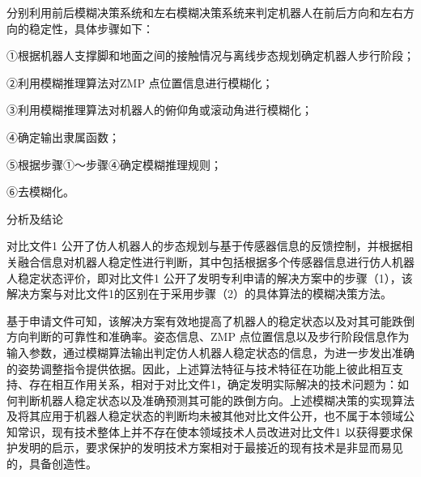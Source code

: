 {\setlength{\parindent}{15.3bp}分别利用前后模糊决策系统和左右模糊决策系统来判定机器人在前后方向和左右方向的稳定性，具体步骤如下：\par}

{\setlength{\parindent}{20.6bp}①根据机器人支撑脚和地面之间的接触情况与离线步态规划确定机器人步行阶段；\par}

{\setlength{\parindent}{20.6bp}②利用模糊推理算法对ZMP 点位置信息进行模糊化；\par}

{\setlength{\parindent}{20.6bp}③利用模糊推理算法对机器人的俯仰角或滚动角进行模糊化；\par}

{\setlength{\parindent}{20.6bp}④确定输出隶属函数；\par}

{\setlength{\parindent}{20.6bp}⑤根据步骤①～步骤④确定模糊推理规则；\par}

{\setlength{\parindent}{20.6bp}⑥去模糊化。\par}

{\setlength{\parindent}{20.1bp}分析及结论\par}

{\setlength{\parindent}{20.6bp}对比文件1 公开了仿人机器人的步态规划与基于传感器信息的反馈控制，并根据相关融合信息对机器人稳定性进行判断，其中包括根据多个传感器信息进行仿人机器人稳定状态评价，即对比文件1 公开了发明专利申请的解决方案中的步骤（1），该解决方案与对比文件1的区别在于采用步骤（2）的具体算法的模糊决策方法。\par}

{\setlength{\parindent}{20.6bp}基于申请文件可知，该解决方案有效地提高了机器人的稳定状态以及对其可能跌倒方向判断的可靠性和准确率。姿态信息、ZMP 点位置信息以及步行阶段信息作为输入参数，通过模糊算法输出判定仿人机器人稳定状态的信息，为进一步发出准确的姿势调整指令提供依据。因此，上述算法特征与技术特征在功能上彼此相互支持、存在相互作用关系，相对于对比文件1，确定发明实际解决的技术问题为：如何判断机器人稳定状态以及准确预测其可能的跌倒方向。上述模糊决策的实现算法及将其应用于机器人稳定状态的判断均未被其他对比文件公开，也不属于本领域公知常识，现有技术整体上并不存在使本领域技术人员改进对比文件1 以获得要求保护发明的启示，要求保护的发明技术方案相对于最接近的现有技术是非显而易见的，具备创造性。\par}

{\setlength{\parindent}{15.3bp}\par}

